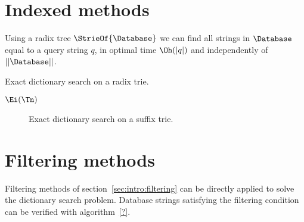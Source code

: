 \section{Indexed methods}

Using a radix tree $\StrieOf{\Database}$ we can find all strings in $\Database$ equal to a query string $q$, in optimal time $\Oh(|q|)$ and independently of $||\Database||$.

\begin{algorithm}[h]
\caption{Exact dictionary search on a radix trie.}
\label{alg:dict-exact}
\begin{algorithmic}[1]
		\State \Report $\Ei(\Tn)$
		\State {}
	\EndIf
\EndProcedure
\end{algorithmic}
\end{algorithm}

\begin{figure}[h]
\begin{center}
\caption{Exact dictionary search on a suffix trie.}
\label{fig:dict-exact}

\end{center}
\end{figure}

\section{Filtering methods}

Filtering methods of section~\ref{sec:intro:filtering} can be directly applied to solve the dictionary search problem. Database strings satisfying the filtering condition can be verified with algorithm~\ref{?}.

